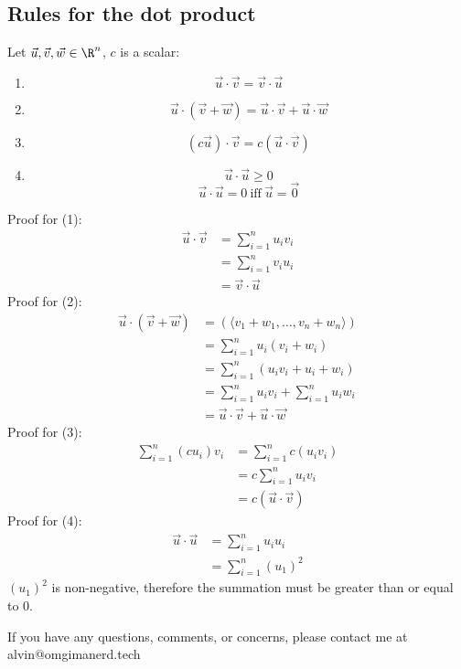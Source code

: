 \documentclass[letterpaper, 12pt]{math}
\begin{document}
\subsection*{Rules for the dot product}
Let \( \vec{u},\vec{v},\vec{w}\in\R^{n} \), \( c \) is a scalar:
\begin{enumerate}
  \item
    \[ \vec{u}\cdot\vec{v} = \vec{v}\cdot\vec{u} \]
  \item
    \[ \vec{u}\cdot(\vec{v}+\vec{w}) =
      \vec{u}\cdot\vec{v}+\vec{u}\cdot\vec{w} \]
  \item
    \[ (c\vec{u})\cdot\vec{v} = c(\vec{u}\cdot\vec{v}) \]
  \item
    \[ \vec{u}\cdot\vec{u}\geq0 \]
    \[ \vec{u}\cdot\vec{u} = 0\ \textrm{iff}\ \vec{u} = \vec{0} \]
\end{enumerate}
Proof for (1):
\begin{align*}
  \vec{u}\cdot\vec{v} &= \sum_{i=1}^{n}u_{i}v_{i} \\
  &= \sum_{i=1}^{n}v_{i}u_{i} \\
  &= \vec{v}\cdot\vec{u}
\end{align*}
Proof for (2):
\begin{align*}
  \vec{u}\cdot(\vec{v}+\vec{w}) &=
    (\langle v_{1}+w_{1},\dots,v_{n}+w_{n}\rangle) \\
  &= \sum_{i=1}^{n}u_{i}(v_{i}+w_{i}) \\
  &= \sum_{i=1}^{n}(u_{i}v_{i}+u_{i}+w_{i}) \\
  &= \sum_{i=1}^{n}u_{i}v_{i}+\sum_{i=1}^{n}u_{i}w_{i} \\
  &= \vec{u}\cdot\vec{v}+\vec{u}\cdot\vec{w}
\end{align*}
Proof for (3):
\begin{align*}
  \sum_{i=1}^{n}(cu_{i})v_{i} &= \sum_{i=1}^{n}c(u_{i}v_{i}) \\
  &= c\sum_{i=1}^{n}u_{i}v_{i} \\
  &= c(\vec{u}\cdot\vec{v})
\end{align*}
Proof for (4):
\begin{align*}
  \vec{u}\cdot\vec{u} &= \sum_{i=1}^{n}u_{i}u_{i} \\
  &= \sum_{i=1}^{n}(u_{1})^{2}
\end{align*}
\( (u_{1})^{2} \) is non-negative, therefore the summation must be greater than
or equal to 0.

\begin{center}
  If you have any questions, comments, or concerns, please contact me at
  alvin@omgimanerd.tech
\end{center}
\end{document}
